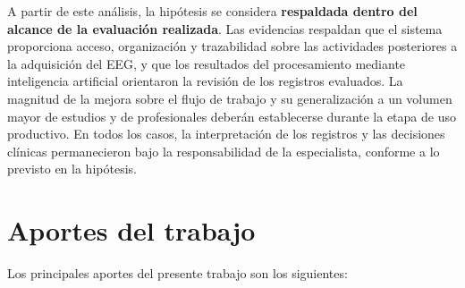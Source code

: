 A partir de este análisis, la hipótesis se considera \textbf{respaldada dentro del alcance de la evaluación realizada}.
Las evidencias respaldan que el sistema proporciona acceso, organización y trazabilidad sobre las actividades posteriores a la adquisición del EEG, y que los resultados del procesamiento mediante inteligencia artificial orientaron la revisión de los registros evaluados.
La magnitud de la mejora sobre el flujo de trabajo y su generalización a un volumen mayor de estudios y de profesionales deberán establecerse durante la etapa de uso productivo.
En todos los casos, la interpretación de los registros y las decisiones clínicas permanecieron bajo la responsabilidad de la especialista, conforme a lo previsto en la hipótesis.


\section{Aportes del trabajo}
\label{sec:aportes}

Los principales aportes del presente trabajo son los siguientes:

